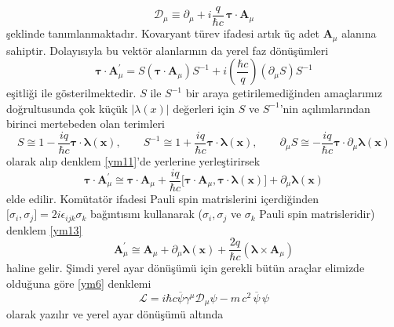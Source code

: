 \begin{equation} \label{ym10}
\mathcal{D}_{\mu} \equiv \partial_{\mu} + i\frac{q}{\hbar c}\, \boldsymbol{\tau} \cdot \mathbf{A}_{\mu}
\end{equation}
şeklinde tanımlanmaktadır. Kovaryant türev ifadesi artık üç adet $\mathbf{A}_{\mu}$ alanına sahiptir. Dolayısıyla bu vektör alanlarının da yerel faz dönüşümleri
\begin{equation} \label{ym11}
\boldsymbol{\tau}\cdot\mathbf{A}^{'}_{\mu} = S(\boldsymbol{\tau}\cdot\mathbf{A}_{\mu})S^{-1} + i\left(\frac{\hbar c}{q}\right)(\partial_{\mu}S)S^{-1}
\end{equation}
eşitliği ile gösterilmektedir. $S$ ile $S^{-1}$ bir araya getirilemediğinden amaçlarımız doğrultusunda çok küçük $|\lambda(x)|$ değerleri için $S$ ve $S^{-1}$'nin açılımlarından birinci mertebeden olan terimleri
\begin{equation} \label{ym12}
S \cong 1 - \frac{i q}{\hbar c}\boldsymbol{\tau}\cdot\boldsymbol{\lambda(x)},\qquad
S^{-1} \cong 1 + \frac{i q}{\hbar c}\boldsymbol{\tau}\cdot\boldsymbol{\lambda(x)},\qquad
\partial_{\mu}S \cong - \frac{i q}{\hbar c}\boldsymbol{\tau}\cdot\partial_{\mu}\boldsymbol{\lambda(x)}
\end{equation}
olarak alıp denklem \eqref{ym11}'de yerlerine yerleştirirsek
\begin{equation} \label{ym13}
\boldsymbol{\tau}\cdot\mathbf{A}^{'}_{\mu} \cong \boldsymbol{\tau}\cdot\mathbf{A}_{\mu} + \frac{iq}{\hbar c}\big[\boldsymbol{\tau}\cdot\mathbf{A}_{\mu} , \boldsymbol{\tau}\cdot\boldsymbol{\lambda(x)}\big] + \partial_{\mu}\boldsymbol{\lambda(x)}
\end{equation}
elde edilir. Komütatör ifadesi Pauli spin matrislerini içerdiğinden $\big[ \sigma_{i} ,  \sigma_{j} \big] = 2i\epsilon_{ijk}\sigma_{k}$ bağıntısını kullanarak   ($ \sigma_{i} ,  \sigma_{j}$ ve $\sigma_{k}$ Pauli spin matrisleridir) denklem \eqref{ym13}
\begin{equation} \label{ym14}
\mathbf{A}^{'}_{\mu} \cong \mathbf{A}_{\mu} + \partial_{\mu}\boldsymbol{\lambda(x)} + \frac{2q}{\hbar c}(\boldsymbol{\lambda} \times \mathbf{A}_{\mu})
\end{equation}
haline gelir. Şimdi yerel ayar dönüşümü için gerekli bütün araçlar elimizde olduğuna göre \eqref{ym6} denklemi
\begin{equation} \label{ym15}
\mathcal{L} = i\hbar c\overline{\psi}\gamma^{\mu}\mathcal{D}_{\mu} \psi - m\,c^{2}\,\overline{\psi}\,\psi
\end{equation}
olarak yazılır ve yerel ayar dönüşümü altında 

